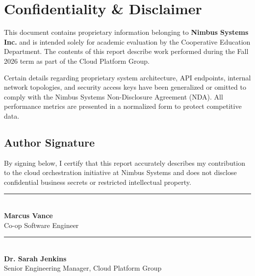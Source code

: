 \section*{Confidentiality \& Disclaimer}

\begin{confidentialbox}
This document contains proprietary information belonging to \textbf{Nimbus Systems Inc.} and is intended solely for academic evaluation by the Cooperative Education Department. The contents of this report describe work performed during the Fall 2026 term as part of the Cloud Platform Group.

Certain details regarding proprietary system architecture, API endpoints, internal network topologies, and security access keys have been generalized or omitted to comply with the Nimbus Systems Non-Disclosure Agreement (NDA). All performance metrics are presented in a normalized form to protect competitive data.
\end{confidentialbox}

\vspace{1.5cm}

\subsection*{Author Signature}

By signing below, I certify that this report accurately describes my contribution to the cloud orchestration initiative at Nimbus Systems and does not disclose confidential business secrets or restricted intellectual property.

\vspace{1.5cm}

\noindent
\begin{minipage}[t]{0.45\textwidth}
  \rule{\textwidth}{0.5pt}\\
  \textbf{Marcus Vance}\\
  Co-op Software Engineer
\end{minipage}
\hfill
\begin{minipage}[t]{0.45\textwidth}
  \rule{\textwidth}{0.5pt}\\
  \textbf{Dr. Sarah Jenkins}\\
  Senior Engineering Manager, Cloud Platform Group
\end{minipage}

